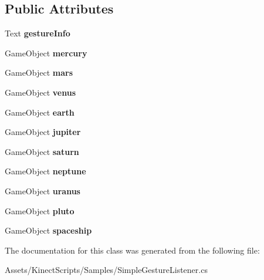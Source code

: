\subsection*{Public Attributes}
\begin{DoxyCompactItemize}
\item 
\mbox{\label{class_simple_gesture_listener_a39607eeb5fdd0e80d46d4a61fada2847}} 
Text {\bfseries gesture\+Info}
\item 
\mbox{\label{class_simple_gesture_listener_a40f39c51c72ea379efbce9a84156bb5a}} 
Game\+Object {\bfseries mercury}
\item 
\mbox{\label{class_simple_gesture_listener_a04043c86a09bc4e4e844b003cc7892b2}} 
Game\+Object {\bfseries mars}
\item 
\mbox{\label{class_simple_gesture_listener_aef0dd502d70df5beb875491cf97c2449}} 
Game\+Object {\bfseries venus}
\item 
\mbox{\label{class_simple_gesture_listener_a46952f40626082a4b9284b537c7f859d}} 
Game\+Object {\bfseries earth}
\item 
\mbox{\label{class_simple_gesture_listener_ac3e1dc6250e8c99ec784952e17bdcef7}} 
Game\+Object {\bfseries jupiter}
\item 
\mbox{\label{class_simple_gesture_listener_a5153012e62a475d247ca1f097da0d61a}} 
Game\+Object {\bfseries saturn}
\item 
\mbox{\label{class_simple_gesture_listener_a609a50baf334b0a599b6b0fb0ecced17}} 
Game\+Object {\bfseries neptune}
\item 
\mbox{\label{class_simple_gesture_listener_aa33da1e500332c8b2ced48906d461962}} 
Game\+Object {\bfseries uranus}
\item 
\mbox{\label{class_simple_gesture_listener_acfb3d06e489cc3e815cbcbaddcf9e939}} 
Game\+Object {\bfseries pluto}
\item 
\mbox{\label{class_simple_gesture_listener_a496557f64816f7a44a0bd98df3d7d5c5}} 
Game\+Object {\bfseries spaceship}
\end{DoxyCompactItemize}


The documentation for this class was generated from the following file\+:\begin{DoxyCompactItemize}
\item 
Assets/\+Kinect\+Scripts/\+Samples/Simple\+Gesture\+Listener.\+cs\end{DoxyCompactItemize}
